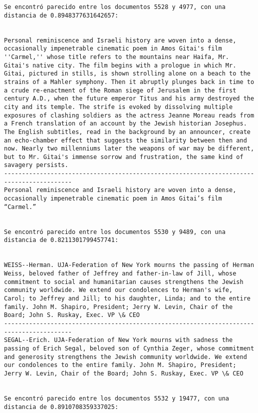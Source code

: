 \documentclass[11pt]{article}
\begin{document}
\begin{Verbatim}[commandchars=\\\{\}]
Se encontró parecido entre los documentos 5528 y 4977, con una distancia de 0.8948377631642657:


Personal reminiscence and Israeli history are woven into a dense, occasionally impenetrable cinematic poem in Amos Gitai's film ''Carmel,'' whose title refers to the mountains near Haifa, Mr. Gitai's native city. The film begins with a prologue in which Mr. Gitai, pictured in stills, is shown strolling alone on a beach to the strains of a Mahler symphony. Then it abruptly plunges back in time to a crude re-enactment of the Roman siege of Jerusalem in the first century A.D., when the future emperor Titus and his army destroyed the city and its temple. The strife is evoked by dissolving multiple exposures of clashing soldiers as the actress Jeanne Moreau reads from a French translation of an account by the Jewish historian Josephus. The English subtitles, read in the background by an announcer, create an echo-chamber effect that suggests the similarity between then and now. Nearly two millenniums later the weapons of war may be different, but to Mr. Gitai's immense sorrow and frustration, the same kind of savagery persists.
-----------------------------------------------------------------------------------------
Personal reminiscence and Israeli history are woven into a dense, occasionally impenetrable cinematic poem in Amos Gitai’s film “Carmel.”


Se encontró parecido entre los documentos 5530 y 9489, con una distancia de 0.8211301799457741:


WEISS--Herman. UJA-Federation of New York mourns the passing of Herman Weiss, beloved father of Jeffrey and father-in-law of Jill, whose commitment to social and humanitarian causes strengthens the Jewish community worldwide. We extend our condolences to Herman's wife, Carol; to Jeffrey and Jill; to his daughter, Linda; and to the entire family. John M. Shapiro, President; Jerry W. Levin, Chair of the Board; John S. Ruskay, Exec. VP \& CEO
-----------------------------------------------------------------------------------------
SEGAL--Erich. UJA-Federation of New York mourns with sadness the passing of Erich Segal, beloved son of Cynthia Zeger, whose commitment and generosity strengthens the Jewish community worldwide. We extend our condolences to the entire family. John M. Shapiro, President; Jerry W. Levin, Chair of the Board; John S. Ruskay, Exec. VP \& CEO


Se encontró parecido entre los documentos 5532 y 19477, con una distancia de 0.8910708359337025:



\end{Verbatim}
\end{document}
